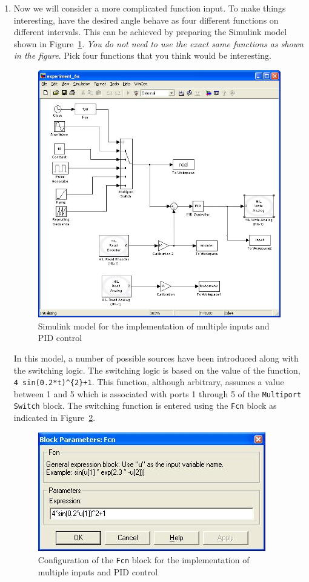 \begin{enumerate}
    \item Now we will consider a more complicated function input. To make things interesting, have the desired angle behave
          as four different functions on different intervals.  This can be achieved by
          preparing the \textsf{Simulink} model shown in Figure~\ref{fig:multiSwitch}\@.
          \emph{You do not need to use the exact same functions as shown in the figure}. Pick
          four functions that you think would be interesting.
          \begin{figure}[htbp]
              \centering
              \includegraphics[width=0.6\hsize]{pix/lab6b.jpg}
              \caption{\textsf{Simulink} model for the implementation of multiple inputs and PID control}\label{fig:multiSwitch}
          \end{figure}%
          In this model, a number of possible sources have been introduced along with
          the switching logic.  The switching logic is based on the value of the
          function, \verb|4 sin(0.2*t)^{2}+1|.  This function, although arbitrary,
          assumes a value between 1 and 5 which is associated with ports 1 through 5 of
          the \verb|Multiport Switch| block.  The switching function is entered using
          the \verb|Fcn| block as indicated in Figure~\ref{fig:switchConfig}\@.
          \begin{figure}[htbp]
              \centering
              \includegraphics[width=0.6\hsize]{pix/fcnParameters.jpg}
              \caption{Configuration of the \texttt{Fcn} block for the implementation of multiple inputs and PID control}\label{fig:switchConfig}
          \end{figure}%


\end{enumerate}
